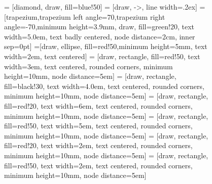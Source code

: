 \documentclass[12pt]{article}
\begin{document}
\begin{figure}[ht!]
   = [diamond, draw, fill=blue!50]
   = [draw, ->, line width=.2ex]
   = [trapezium,trapezium left angle=70,trapezium right angle=-70,minimum height=3.9mm, draw, fill=green!20, text width=5.0em, text badly centered, node distance=2cm, inner sep=0pt]
  =[draw, ellipse, fill=red!50,minimum height=5mm, text width=2em, text centered]
   = [draw, rectangle, fill=red!50, text width=3em, text centered, rounded corners, minimum height=10mm, node distance=5em]
   = [draw, rectangle, fill=black!30, text width=4.0em, text centered, rounded corners, minimum height=10mm, node distance=5em]
   = [draw, rectangle, fill=red!20, text width=6em, text centered, rounded corners, minimum height=10mm, node distance=5em]
   = [draw, rectangle, fill=red!50, text width=5em, text centered, rounded corners, minimum height=10mm, node distance=5em]
   = [draw, rectangle, fill=red!20, text width=2em, text centered, rounded corners, minimum height=10mm, node distance=5em]
   = [draw, rectangle, fill=red!50, text width=2em, text centered, rounded corners, minimum height=10mm, node distance=5em]
  \begin{center}
\end{center}
\end{figure}
\end{document}
